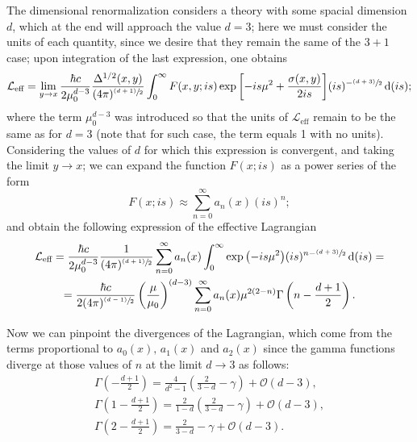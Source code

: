 The dimensional renormalization considers a theory with some spacial dimension $d$, which at the end will approach the value $d=3$; here we must consider the units of each quantity, since we desire that they remain the same of the $3+1$ case; upon integration of the last expression, one obtains 
\begin{equation}
	\mathcal{L}_{\text{eff}}=\lim\limits_{y\to x}\frac{\hbar c}{2\mu_0^{d-3}}\frac{\Delta^{1/2}(x,y)}{(4\pi)^{\sfrac{(d+1)}{2}}}\int^\infty_0F(x,y;is)\exp{\left[-is\mu^2+\frac{\sigma(x,y)}{2is}\right]}(is)^{-\sfrac{(d+3)}{2}}\,\text{d} (is);
\end{equation}
where the term $\mu_0^{d-3}$ was introduced so that the units of $\mathcal{L}_{\text{eff}}$ remain to be the same as for $d=3$ (note that for such case, the term equals 1 with no units). Considering the values of $d$ for which this expression is convergent, and taking the limit $y\to x$; we can expand the function $F(x;is)$ as a power series of the form
\begin{equation}
	F(x;is)\approx \sum_{n=0}^\infty a_n(x)(is)^n;
\end{equation}
and obtain the following expression of the effective Lagrangian
\begin{multline}
	\mathcal{L}_{\text{eff}}=\frac{\hbar c}{2\mu_0^{d-3}}\frac{1}{(4\pi)^{\sfrac{(d+1)}{2}}}\sum_{n=0}^\infty a_n(x)\int^\infty_0\exp{\left(-is\mu^2\right)}(is)^{n-\sfrac{(d+3)}{2}}\,\text{d} (is)=\\
	=\frac{\hbar c}{2(4\pi)^{\sfrac{(d-1)}{2}}}\left(\frac{\mu}{\mu_0}\right)^{(d-3)}\sum_{n=0}^{\infty}a_n(x)\mu^{2(2-n)}\Gamma\left(n-\frac{d+1}{2}\right).
\end{multline}

Now we can pinpoint the divergences of the Lagrangian, which come from the terms proportional to $a_0(x),\,a_1(x)$ and $a_2(x)$ since the gamma functions diverge at those values of $n$ at the limit $d\to 3$ as follows:
\begin{subequations}
	\begin{gather}
		\Gamma\left(-\frac{d+1}{2}\right)=\frac{4}{d^2-1}\left(\frac{2}{3-d}-\gamma\right)+\mathcal{O}(d-3),\\
		\Gamma\left(1-\frac{d+1}{2}\right)=\frac{2}{1-d}\left(\frac{2}{3-d}-\gamma\right)+\mathcal{O}(d-3),\\
		\Gamma\left(2-\frac{d+1}{2}\right)=\frac{2}{3-d}-\gamma+\mathcal{O}(d-3).
	\end{gather}
\end{subequations}

